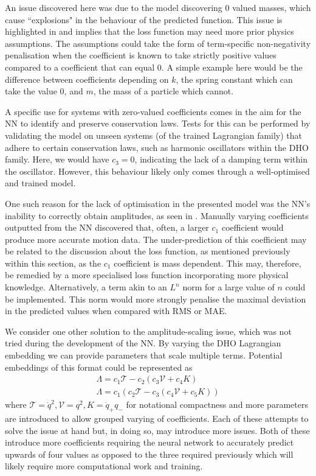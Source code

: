 \documentclass[10pt]{iopart}
\begin{document}
An issue discovered here was due to the model discovering 0 valued masses, which cause ``explosions" in the behaviour of the predicted function. This issue is highlighted in  and implies that the loss function may need more prior physics assumptions. The assumptions could take the form of term-specific non-negativity penalisation when the coefficient is known to take strictly positive values compared to a coefficient that can equal 0. A simple example here would be the difference between coefficients depending on $k$, the spring constant which can take the value 0, and $m$, the mass of a particle which cannot.

A specific use for systems with zero-valued coefficients comes in the aim for the NN to identify and preserve conservation laws. Tests for this can be performed by validating the model on unseen systems (of the trained Lagrangian family) that adhere to certain conservation laws, such as harmonic oscillators within the DHO family. Here, we would have $c_3=0$, indicating the lack of a damping term within the oscillator. However, this behaviour likely only comes through a well-optimised and trained model. 

One such reason for the lack of optimisation in the presented model was the NN's inability to correctly obtain amplitudes, as seen in . Manually varying coefficients outputted from the NN discovered that, often, a larger $c_1$ coefficient would produce more accurate motion data. The under-prediction of this coefficient may be related to the discussion about the loss function, as mentioned previously within this section, as the $c_1$ coefficient is mass dependent. This may, therefore, be remedied by a more specialised loss function incorporating more physical knowledge. Alternatively, a term akin to an $L^n$ norm for a large value of $n$ could be implemented. This norm would more strongly penalise the maximal deviation in the predicted values when compared with RMS or MAE.

We consider one other solution to the amplitude-scaling issue, which was not tried during the development of the NN. By varying the DHO Lagrangian embedding we can provide parameters that scale multiple terms. Potential embeddings of this format could be represented as
\begin{subequations}
\label{newEmbeddings}
\begin{align}
		\Lambda = c_1 \mathcal T - c_2\left(c_3 \mathcal V + c_4K\right) \\
		\Lambda = c_1\left(c_2 \mathcal T - c_3\left(c_4 \mathcal V + c_5K\right)\right) 
\end{align}
\end{subequations}
where $\mathcal T=\dot q^2, \mathcal V = q^2, K = \dot q_+q_-$ for notational compactness and more parameters are introduced to allow grouped varying of coefficients. Each of these attempts to solve the issue at hand but, in doing so, may introduce more issues. Both of these introduce more coefficients requiring the neural network to accurately predict upwards of four values as opposed to the three required previously which will likely require more computational work and training. 
\end{document}

